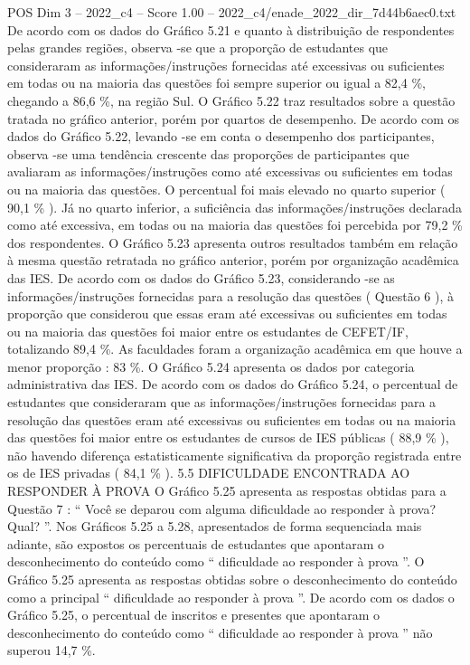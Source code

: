 \begin{textsample}{POS Dim 3 – 2022\_c4 – Score 1.00 – 2022\_c4/enade\_2022\_dir\_7d44b6aec0.txt}
De acordo com os dados do Gráfico 5.21 e quanto à distribuição de respondentes pelas grandes regiões, observa -se que a proporção de estudantes que consideraram as informações/instruções fornecidas até excessivas ou suficientes em todas ou na maioria das questões foi sempre superior ou igual a 82,4 \%, chegando a 86,6 \%, na região Sul.
O Gráfico 5.22 traz resultados sobre a questão tratada no gráfico anterior, porém por quartos de desempenho.
De acordo com os dados do Gráfico 5.22, levando -se em conta o desempenho dos participantes, observa -se uma tendência crescente das proporções de participantes que avaliaram as informações/instruções como até excessivas ou suficientes em todas ou na maioria das questões.
O percentual foi mais elevado no quarto superior ( 90,1 \% ).
Já no quarto inferior, a suficiência das informações/instruções declarada como até excessiva, em todas ou na maioria das questões foi percebida por 79,2 \% dos respondentes.
O Gráfico 5.23 apresenta outros resultados também em relação à mesma questão retratada no gráfico anterior, porém por organização acadêmica das IES.
De acordo com os dados do Gráfico 5.23, considerando -se as informações/instruções fornecidas para a resolução das questões ( Questão 6 ), à proporção que considerou que essas eram até excessivas ou suficientes em todas ou na maioria das questões foi maior entre os estudantes de CEFET/IF, totalizando 89,4 \%.
As faculdades foram a organização acadêmica em que houve a menor proporção : 83 \%.
O Gráfico 5.24 apresenta os dados por categoria administrativa das IES.
De acordo com os dados do Gráfico 5.24, o percentual de estudantes que consideraram que as informações/instruções fornecidas para a resolução das questões eram até excessivas ou suficientes em todas ou na maioria das questões foi maior entre os estudantes de cursos de IES públicas ( 88,9 \% ), não havendo diferença estatisticamente significativa da proporção registrada entre os de IES privadas ( 84,1 \% ). 5.5 DIFICULDADE ENCONTRADA AO RESPONDER À PROVA O Gráfico 5.25 apresenta as respostas obtidas para a Questão 7 : “ Você se deparou com alguma dificuldade ao responder à prova?
Qual? ”.
Nos Gráficos 5.25 a 5.28, apresentados de forma sequenciada mais adiante, são expostos os percentuais de estudantes que apontaram o desconhecimento do conteúdo como “ dificuldade ao responder à prova ”.
O Gráfico 5.25 apresenta as respostas obtidas sobre o desconhecimento do conteúdo como a principal “ dificuldade ao responder à prova ”.
De acordo com os dados o Gráfico 5.25, o percentual de inscritos e presentes que apontaram o desconhecimento do conteúdo como “ dificuldade ao responder à prova ” não superou 14,7 \%.

\end{textsample}
